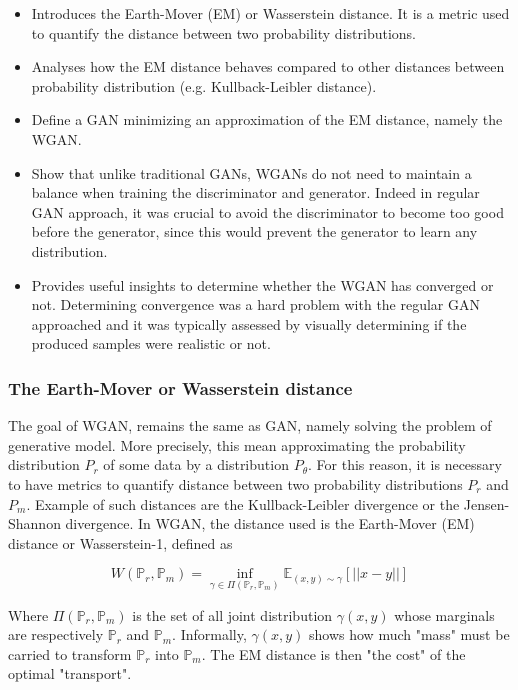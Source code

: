 \documentclass[11pt,a4paper,twoside]{report}
\begin{document}
\begin{itemize}
    \item Introduces the Earth-Mover (EM) or Wasserstein distance. It is a metric used to quantify the distance between two probability distributions.
    \item Analyses how the EM distance behaves compared to other distances between probability distribution (e.g. Kullback-Leibler distance).
    \item Define a GAN minimizing an approximation of the EM distance, namely the WGAN.
    \item Show that unlike traditional GANs, WGANs do not need to maintain a balance when training the discriminator and generator. Indeed in regular GAN approach, it was crucial to avoid the discriminator to become too good before the generator, since this would prevent the generator to learn any distribution.
    \item Provides useful insights to determine whether the WGAN has converged or not. Determining convergence was a hard problem with the regular GAN approached and it was typically assessed by visually determining if the produced samples were realistic or not.
\end{itemize}


\subsubsection{The Earth-Mover or Wasserstein distance}


The goal of WGAN, remains the same as GAN, namely solving the problem of generative model. More precisely, this mean approximating the probability distribution $P_r$ of some data by a distribution $P_{\theta}$. For this reason, it is necessary to have metrics to quantify distance between two probability distributions $P_r$ and $P_m$. Example of such distances are the Kullback-Leibler divergence or the Jensen-Shannon divergence. In WGAN, the distance used is the Earth-Mover (EM) distance or Wasserstein-1, defined as 

\begin{equation}
    W(\mathbb{P}_r, \mathbb{P}_m) = \inf_{\gamma \in \Pi(\mathbb{P}_r, \mathbb{P}_m)} \mathbb{E}_{(x,y) \sim \gamma} [||x-y||]
\end{equation}

Where $\Pi(\mathbb{P}_r, \mathbb{P}_m)$ is the set of all joint distribution $\gamma(x,y)$ whose marginals are respectively $\mathbb{P}_r$ and $\mathbb{P}_m$. Informally, $\gamma(x,y)$ shows how much "mass" must be carried to transform $\mathbb{P}_r$ into $\mathbb{P}_m$. The EM distance is then "the cost" of the optimal "transport".
\end{document}
